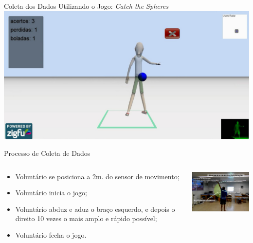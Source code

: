 \documentclass{beamer}
\begin{document}
\begin{frame}{Coleta dos Dados Utilizando o Jogo: \textit{Catch the Spheres}}
      \center \includegraphics[height=2.2 in]{img/catch-the-spheres.png}
\end{frame}


\begin{frame}{Processo de Coleta de Dados}
   \begin{block}{}   
   \begin{columns}[c]
     \begin{column}{0.5\linewidth}
				\begin{itemize}[<+->]
					\item Voluntário se posiciona a 2m. do sensor de movimento;
					\item Voluntário inicia o jogo;
					\item Voluntário abduz e aduz o braço esquerdo, e depois o direito 10 vezes o mais amplo e rápido possível;
					\item Voluntário fecha o jogo.
				\end{itemize}
     \end{column}

     \begin{column}{0.55\linewidth}
				\includegraphics[width=5.5cm]{img/capturaducaokinnect.png}
    \end{column}
\end{columns}
\end{block}
\end{frame}
% 
% 
% 
\end{document}
